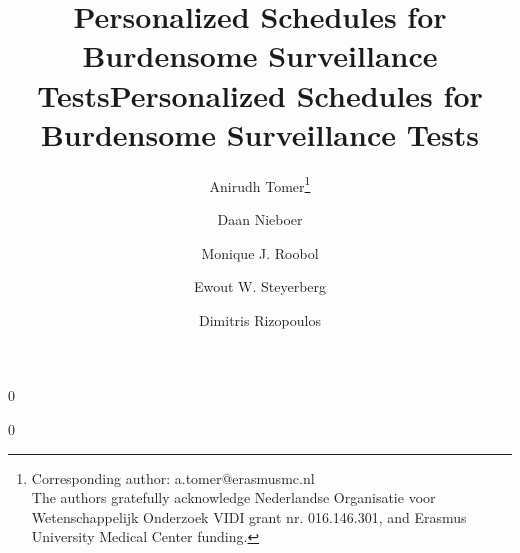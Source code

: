 \documentclass[12pt]{article}
\newcommand{\blind}{0}
\begin{document}
%

\def\spacingset#1{\renewcommand{\baselinestretch}%
{#1}\small\normalsize} \spacingset{1}



\blind
{
  \title{\bf Personalized Schedules for Burdensome Surveillance Tests}

\author[1]{Anirudh Tomer\footnote{Corresponding author: a.tomer@erasmusmc.nl\\The authors gratefully acknowledge Nederlandse Organisatie voor Wetenschappelijk Onderzoek VIDI grant nr. 016.146.301, and Erasmus University Medical Center funding.}}
\author[2]{Daan Nieboer}
\author[3]{Monique J. Roobol}
\author[2,4]{Ewout W. Steyerberg}
\author[1]{Dimitris Rizopoulos}




  \maketitle
  \clearpage 
} \fi

\blind
{
 \title{\bf Personalized Schedules for Burdensome Surveillance Tests}
\author{}
\date{\vspace{-2cm}}
\maketitle
\bigskip
} \fi
\end{document}
